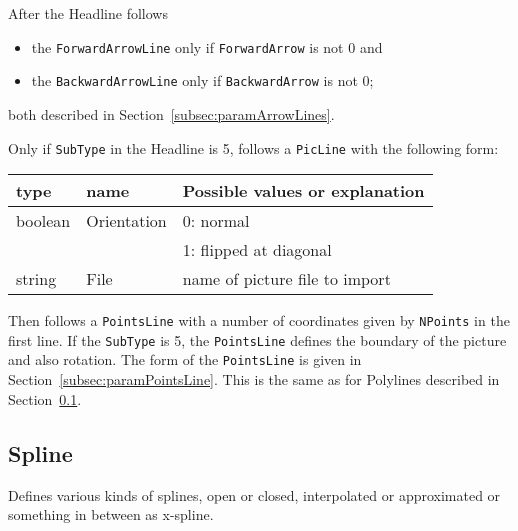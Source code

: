 \documentclass[10pt, a4paper]{article}
\begin{document}
\noindent
After the Headline follows 
%
\begin{itemize}
\item
the \texttt{ForwardArrowLine}  only if \texttt{ForwardArrow}  is not 0 and 
\item
the \texttt{BackwardArrowLine} only if \texttt{BackwardArrow} is not 0; 
\end{itemize}
%
both described in Section~\ref{subsec:paramArrowLines}. 


Only if \texttt{SubType} in the Headline is 5, 
follows a \texttt{PicLine} with the following form:
%
\begin{tabular}{lll}
\toprule
type    & name        & Possible values or explanation \\
\midrule
\midrule
boolean & Orientation & 0: normal \\
&&                      1: flipped at diagonal \\
string  & File        & name of picture file to import \\
\bottomrule
\end{tabular}

Then follows a \texttt{PointsLine} with a number of coordinates 
given by \texttt{NPoints} in the first line. 
If the \texttt{SubType} is 5, the \texttt{PointsLine} 
defines the boundary of the picture and also rotation. 
The form of the \texttt{PointsLine} is given 
in Section~\ref{subsec:paramPointsLine}. 
This is the same as for Polylines described in Section~\ref{subsec:spline}. 



\subsection{Spline }\label{subsec:spline}

Defines various kinds of splines, 
open or closed, interpolated or approximated or 
something in between as x-spline. 
\end{document}
